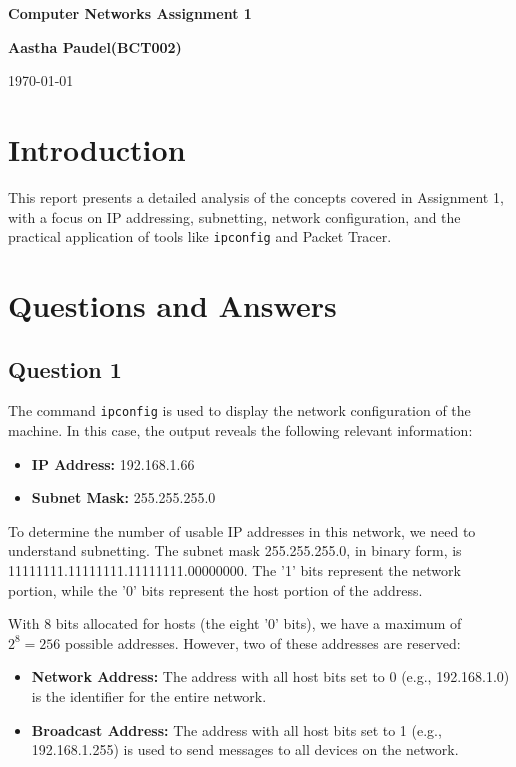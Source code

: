 \documentclass[12pt]{article}
\begin{document}
\begin{titlepage}
\centering
\vspace*{1in}
{\Huge\bfseries Computer Networks Assignment 1\par}
\vspace{1in}
{\Large\bfseries Aastha Paudel(BCT002) \\
\par}
\vfill
\today
\end{titlepage}

\clearpage
\tableofcontents

\section{Introduction}
This report presents a detailed analysis of the concepts covered in Assignment 1, with a focus on IP addressing, subnetting, network configuration, and the practical application of tools like \texttt{ipconfig} and Packet Tracer.

\section{Questions and Answers}

\subsection*{Question 1}
The command \texttt{ipconfig} is used to display the network configuration of the machine. In this case, the output reveals the following relevant information:

\begin{itemize}
\item \textbf{IP Address:} 192.168.1.66
\item \textbf{Subnet Mask:} 255.255.255.0
\end{itemize}

To determine the number of usable IP addresses in this network, we need to understand subnetting. The subnet mask 255.255.255.0, in binary form, is 11111111.11111111.11111111.00000000. The '1' bits represent the network portion, while the '0' bits represent the host portion of the address.

With 8 bits allocated for hosts (the eight '0' bits), we have a maximum of $2^8 = 256$ possible addresses. However, two of these addresses are reserved:

\begin{itemize}
\item \textbf{Network Address:} The address with all host bits set to 0 (e.g., 192.168.1.0) is the identifier for the entire network.
\item \textbf{Broadcast Address:} The address with all host bits set to 1 (e.g., 192.168.1.255) is used to send messages to all devices on the network.
\end{itemize}
\end{document}
